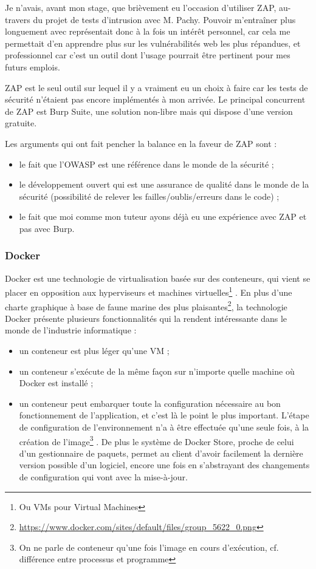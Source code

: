 Je n'avais, avant mon stage, que brièvement eu l'occasion d'utiliser ZAP, au-travers du projet de tests d'intrusion avec M. Pachy. Pouvoir m'entraîner plus longuement avec représentait donc à la fois un intérêt personnel, car cela me permettait d'en apprendre plus sur les vulnérabilités web les plus répandues, et professionnel car c'est un outil dont l'usage pourrait être pertinent pour mes futurs emplois.

ZAP est le seul outil sur lequel il y a vraiment eu un choix à faire car les tests de sécurité n'étaient pas encore implémentés à mon arrivée. Le principal concurrent de ZAP est Burp Suite\cite{burp}, une solution non-libre mais qui dispose d'une version gratuite.

Les arguments qui ont fait pencher la balance en la faveur de ZAP sont :
\begin{itemize}
	\item le fait que l'OWASP est une référence dans le monde de la sécurité ;
	\item le développement ouvert qui est une assurance de qualité dans le monde de la sécurité (possibilité de relever les failles/oublis/erreurs dans le code) ;
	\item le fait que moi comme mon tuteur ayons déjà eu une expérience avec ZAP et pas avec Burp.
\end{itemize}

\subsubsection{Docker}
Docker\cite{docker} est une technologie de virtualisation basée sur des conteneurs, qui vient se placer en opposition aux hyperviseurs et machines virtuelles\footnote{Ou VMs pour Virtual Machines} . En plus d'une charte graphique à base de faune marine des plus plaisantes\footnote{\url{https://www.docker.com/sites/default/files/group_5622_0.png}}, la technologie Docker présente plusieurs fonctionnalités qui la rendent intéressante dans le monde de l'industrie informatique :
\begin{itemize}
	\item un conteneur est plus léger qu'une VM ;
	\item un conteneur s'exécute de la même façon sur n'importe quelle machine où Docker est installé ;
	\item un conteneur peut embarquer toute la configuration nécessaire au bon fonctionnement de l'application, et c'est là le point le plus important. L'étape de configuration de l'environnement n'a à être effectuée qu'une seule fois, à la création de l'image\footnote{On ne parle de conteneur qu'une fois l'image en cours d'exécution, cf. différence entre processus et programme} . De plus le système de Docker Store\cite{docker_store}, proche de celui d'un gestionnaire de paquets, permet au client d'avoir facilement la dernière version possible d'un logiciel, encore une fois en s'abstrayant des changements de configuration qui vont avec la mise-à-jour.
\end{itemize}

